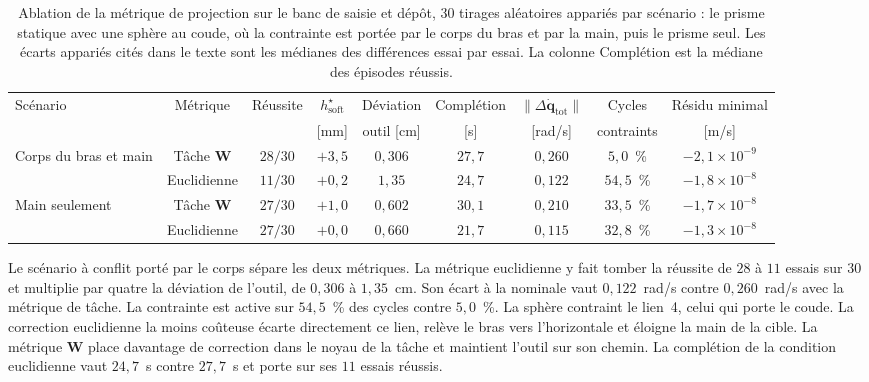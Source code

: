 \begin{table}[htbp]
\centering
\caption[Ablation de la métrique de projection]{Ablation de la métrique de projection sur le banc de saisie et dépôt, $30$ tirages aléatoires appariés par scénario : le prisme statique avec une sphère au coude, où la contrainte est portée par le corps du bras et par la main, puis le prisme seul. Les écarts appariés cités dans le texte sont les médianes des différences essai par essai. La colonne Complétion est la médiane des épisodes réussis.}
\label{tab:res_abl_metrique}
\scriptsize
\setlength{\tabcolsep}{2.5pt}
\begin{tabular}{lcccccccc}
\toprule
Scénario & Métrique & Réussite & $h_{\mathrm{soft}}^{\star}$ & Déviation & Complétion & $\|\Delta\dot{\mathbf{q}}_{\mathrm{tot}}\|$ & Cycles & Résidu minimal \\
 & & & [mm] & outil [cm] & [s] & [rad/s] & contraints & [m/s] \\
\midrule
Corps du bras et main & Tâche $\mathbf{W}$ & $28/30$ & $+3{,}5$ & $0{,}306$ & $27{,}7$ & $0{,}260$ & $5{,}0$~\% & $-2{,}1\times10^{-9}$ \\
 & Euclidienne        & $11/30$ & $+0{,}2$ & $1{,}35$ & $24{,}7$ & $0{,}122$ & $54{,}5$~\% & $-1{,}8\times10^{-8}$ \\
\addlinespace
Main seulement & Tâche $\mathbf{W}$ & $27/30$ & $+1{,}0$ & $0{,}602$ & $30{,}1$ & $0{,}210$ & $33{,}5$~\% & $-1{,}7\times10^{-8}$ \\
 & Euclidienne        & $27/30$ & $+0{,}0$ & $0{,}660$ & $21{,}7$ & $0{,}115$ & $32{,}8$~\% & $-1{,}3\times10^{-8}$ \\
\bottomrule
\end{tabular}
\end{table}

Le scénario à conflit porté par le corps sépare les deux métriques. La métrique euclidienne y fait tomber la réussite de $28$ à $11$ essais sur $30$ et multiplie par quatre la déviation de l'outil, de $0{,}306$ à $1{,}35$~cm. Son écart à la nominale vaut $0{,}122$~rad/s contre $0{,}260$~rad/s avec la métrique de tâche. La contrainte est active sur $54{,}5$~\% des cycles contre $5{,}0$~\%. La sphère contraint le lien~4, celui qui porte le coude. La correction euclidienne la moins coûteuse écarte directement ce lien, relève le bras vers l'horizontale et éloigne la main de la cible. La métrique $\mathbf{W}$ place davantage de correction dans le noyau de la tâche et maintient l'outil sur son chemin. La complétion de la condition euclidienne vaut $24{,}7$~s contre $27{,}7$~s et porte sur ses $11$ essais réussis.

